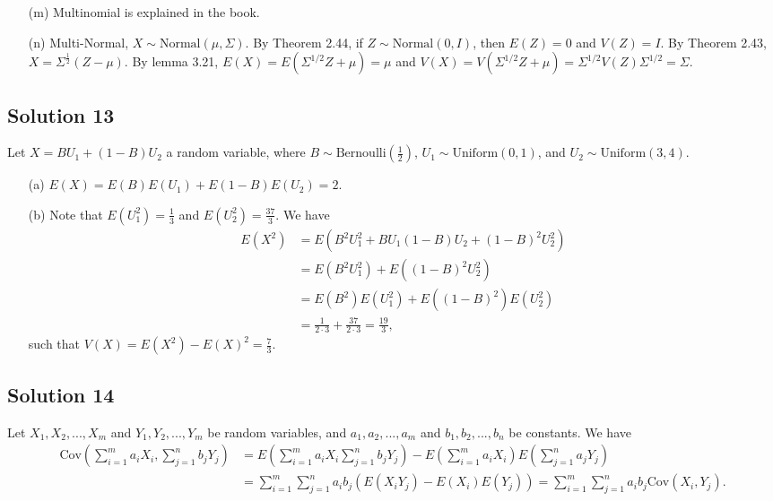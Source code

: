 \begin{itemize}
\item[(m)] Multinomial is explained in the book.

\item[(n)] Multi-Normal, $X \sim \mathrm{Normal}(\mu, \Sigma)$.
By Theorem 2.44, if $Z \sim \mathrm{Normal}(0, I)$, then $E(Z) = 0$ and $V(Z) = I$.
By Theorem 2.43, $X = \Sigma^{\frac{1}{2}} (Z - \mu)$.
By lemma 3.21, $E(X) = E(\Sigma^{1/2}Z + \mu) = \mu$ and $V(X) = V(\Sigma^{1/2}Z + \mu) = \Sigma^{1/2} V(Z) \Sigma^{1/2} = \Sigma$.

\end{itemize}


\subsection*{Solution 13}

Let $X = B U_1 + (1 - B) U_2$ a random variable, where $B \sim \mathrm{Bernoulli}(\frac{1}{2})$, $U_1 \sim \mathrm{Uniform}(0, 1)$, and $U_2 \sim \mathrm{Uniform}(3, 4)$.

\begin{itemize}
    \item[(a)] $E(X) = E(B)E(U_1) + E(1-B)E(U_2) = 2$.
    \item[(b)] Note that $E(U_1^2) = \frac{1}{3}$ and $E(U_2^2) = \frac{37}{3}$.
        We have
        \begin{equation*}
            \begin{split}
                E(X^2) &= E(B^2 U_1^2 + B U_1 (1 - B) U_2 + (1 - B)^2 U_2^2) \\
                    &= E(B^2 U_1^2) + E((1 - B)^2 U_2^2) \\
                    &= E(B^2) E(U_1^2) + E((1 - B)^2) E(U_2^2) \\
                    &= \frac{1}{2 \cdot 3} + \frac{37}{2 \cdot 3}
                    = \frac{19}{3},
            \end{split}
        \end{equation*}
        such that $V(X) = E(X^2) - E(X)^2 = \frac{7}{3}$.
\end{itemize}


\subsection*{Solution 14}

Let $X_1, X_2, ..., X_m$ and $Y_1, Y_2, ..., Y_m$ be random variables, and $a_1, a_2, ..., a_m$ and $b_1, b_2, ..., b_n$ be constants.
We have
\begin{equation*}
    \begin{split}
        \mathrm{Cov}\left(\sum_{i=1}^m a_i X_i, \sum_{j=1}^n b_j Y_j\right)
            &= E\left(\sum_{i=1}^m a_i X_i \sum_{j=1}^n b_j Y_j\right) - E\left(\sum_{i=1}^m a_i X_i\right) E\left(\sum_{j=1}^n a_j Y_j\right) \\
            &= \sum_{i=1}^m \sum_{j=1}^n a_i b_j \left( E(X_i Y_j) - E(X_i) E(Y_j) \right)
            = \sum_{i=1}^m \sum_{j=1}^n a_i b_j \mathrm{Cov}(X_i, Y_j).
    \end{split}
\end{equation*}


